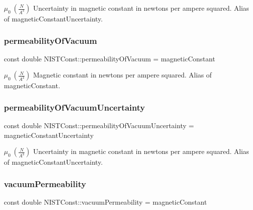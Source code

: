 $\mu_0 \ (\frac{N}{A^3})$ Uncertainty in magnetic constant in newtons per ampere squared. Alias of magnetic\+Constant\+Uncertainty. \mbox{\label{group___magnetic_constant_ga7210c41dfc8fb9dbc41c83282eafebc6}} 
\subsubsection{\texorpdfstring{permeability\+Of\+Vacuum}{permeabilityOfVacuum}}
{\footnotesize\ttfamily const double N\+I\+S\+T\+Const\+::permeability\+Of\+Vacuum = magnetic\+Constant}

$\mu_0 \ (\frac{N}{A^3})$ Magnetic constant in newtons per ampere squared. Alias of magnetic\+Constant. \mbox{\label{group___magnetic_constant_gaa30d6a001f3d52ea07c50ff9c921c8e9}} 
\subsubsection{\texorpdfstring{permeability\+Of\+Vacuum\+Uncertainty}{permeabilityOfVacuumUncertainty}}
{\footnotesize\ttfamily const double N\+I\+S\+T\+Const\+::permeability\+Of\+Vacuum\+Uncertainty = magnetic\+Constant\+Uncertainty}

$\mu_0 \ (\frac{N}{A^3})$ Uncertainty in magnetic constant in newtons per ampere squared. Alias of magnetic\+Constant\+Uncertainty. \mbox{\label{group___magnetic_constant_ga2bf51bbe9c6b75752250c9b133758223}} 
\subsubsection{\texorpdfstring{vacuum\+Permeability}{vacuumPermeability}}
{\footnotesize\ttfamily const double N\+I\+S\+T\+Const\+::vacuum\+Permeability = magnetic\+Constant}

